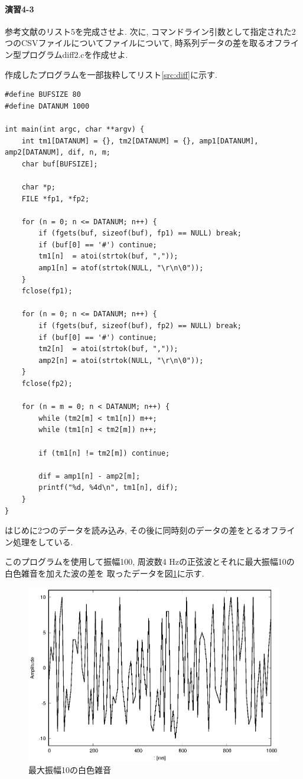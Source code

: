 \documentclass[titlepage]{jsarticle}
\begin{document}
    \paragraph{演習4-3} 参考文献\cite{Text}のリスト5を完成させよ.
    次に, コマンドライン引数として指定された2つのCSVファイルについてファイルについて,
    時系列データの差を取るオフライン型プログラムdiff2.cを作成せよ.

        作成したプログラムを一部抜粋してリスト\ref{src:diff}に示す.
        
        \begin{lstlisting}[caption=diff2.c, label=src:diff]
#define BUFSIZE 80
#define DATANUM 1000

int main(int argc, char **argv) {
    int tm1[DATANUM] = {}, tm2[DATANUM] = {}, amp1[DATANUM], amp2[DATANUM], dif, n, m;
    char buf[BUFSIZE];

    char *p;
    FILE *fp1, *fp2;

    for (n = 0; n <= DATANUM; n++) {
        if (fgets(buf, sizeof(buf), fp1) == NULL) break;
        if (buf[0] == '#') continue;
        tm1[n]  = atoi(strtok(buf, ","));
        amp1[n] = atof(strtok(NULL, "\r\n\0"));
    }
    fclose(fp1);

    for (n = 0; n <= DATANUM; n++) {
        if (fgets(buf, sizeof(buf), fp2) == NULL) break;
        if (buf[0] == '#') continue;
        tm2[n]  = atoi(strtok(buf, ","));
        amp2[n] = atoi(strtok(NULL, "\r\n\0"));
    }
    fclose(fp2);

    for (n = m = 0; n < DATANUM; n++) {
        while (tm2[m] < tm1[n]) m++;
        while (tm1[n] < tm2[m]) n++;

        if (tm1[n] != tm2[m]) continue;

        dif = amp1[n] - amp2[m];
        printf("%d, %4d\n", tm1[n], dif);
    }
}\end{lstlisting}

        はじめに2つのデータを読み込み, その後に同時刻のデータの差をとるオフライン処理をしている.

        このプログラムを使用して振幅100, 周波数4 Hzの正弦波とそれに最大振幅10の白色雑音を加えた波の差を
        取ったデータを図\ref{fig:diff}に示す.

        \begin{figure}[h]
            \centering
            \includegraphics[width=0.8\hsize]{images/diff.eps}
            \caption{最大振幅10の白色雑音}
            \label{fig:diff}
        \end{figure}
\end{document}
